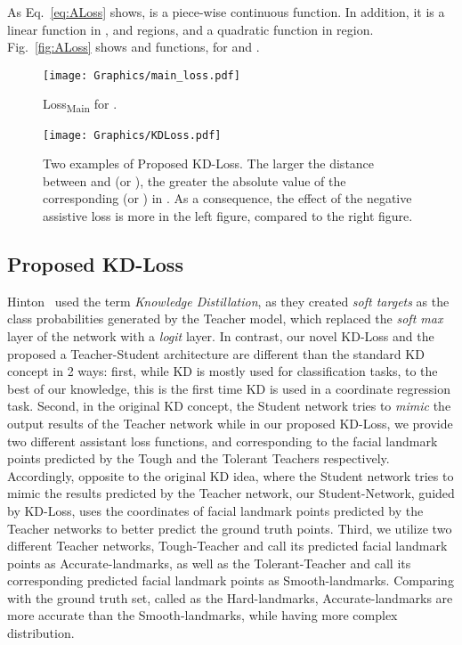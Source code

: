 \documentclass[times,twocolumn,final,authoryear]{elsarticle}
\begin{document}
As Eq.~\ref{eq:ALoss} shows,  is a piece-wise continuous function. In addition, it is a linear function in , and  regions, and a quadratic function in  region. Fig.~\ref{fig:ALoss} shows  and  functions, for  and .

\begin{figure}[t]
\centering
\texttt{[image: Graphics/main\_loss.pdf]}
\caption{ Loss\textsubscript{Main} for .}
\label{fig:main_loss}
\end{figure}


\begin{figure*}[t!]
  \centering
  \texttt{[image: Graphics/KDLoss.pdf]}
  \caption{Two examples of Proposed KD-Loss. The larger the distance between  and  (or ), the greater the absolute value of the corresponding  (or ) in . As a consequence, the effect of the negative assistive loss is more in the left figure, compared to the right figure.}
  \label{fig:kd_loss_and_weight}
\end{figure*}


\subsection{Proposed KD-Loss} \label{sec:knowledgeTransfer}
Hinton~\cite{hinton2015distilling} used the term \textit{Knowledge Distillation}, as they created \textit{soft targets} as the class probabilities generated by the Teacher model, which replaced the \textit{soft max} layer of the network with a \textit{logit} layer. In contrast, our novel KD-Loss and the proposed a Teacher-Student architecture are different than the standard KD concept in 2 ways: first, while KD is mostly used for classification tasks, to the best of our knowledge, this is the first time KD is used in a coordinate regression task. Second, in the original KD concept, the Student network tries to \textit{mimic} the output results of the Teacher network while in our proposed KD-Loss, we provide two different assistant loss functions,  and  corresponding to the facial landmark points predicted by the Tough and the Tolerant Teachers respectively. Accordingly, opposite to the original KD idea, where the Student network tries to mimic the results predicted by the Teacher network, our Student-Network, guided by KD-Loss, uses the coordinates of facial landmark points predicted by the Teacher networks to better predict the ground truth points. Third, we utilize two different Teacher networks, Tough-Teacher and call its predicted facial landmark points as Accurate-landmarks, as well as the Tolerant-Teacher and call its corresponding predicted facial landmark points as Smooth-landmarks. Comparing with the ground truth set, called as the Hard-landmarks, Accurate-landmarks are more accurate than the Smooth-landmarks, while having more complex distribution.
\end{document}
